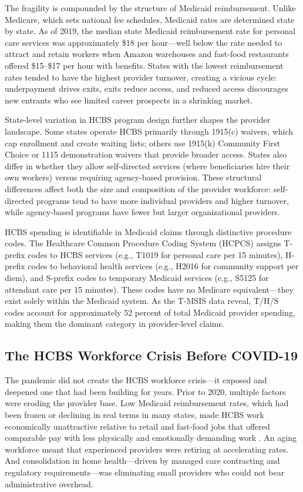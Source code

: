 \documentclass[12pt]{article}
\begin{document}
The fragility is compounded by the structure of Medicaid reimbursement. Unlike Medicare, which sets national fee schedules, Medicaid rates are determined state by state. As of 2019, the median state Medicaid reimbursement rate for personal care services was approximately \$18 per hour---well below the rate needed to attract and retain workers when Amazon warehouses and fast-food restaurants offered \$15--\$17 per hour with benefits. States with the lowest reimbursement rates tended to have the highest provider turnover, creating a vicious cycle: underpayment drives exits, exits reduce access, and reduced access discourages new entrants who see limited career prospects in a shrinking market.

State-level variation in HCBS program design further shapes the provider landscape. Some states operate HCBS primarily through 1915(c) waivers, which cap enrollment and create waiting lists; others use 1915(k) Community First Choice or 1115 demonstration waivers that provide broader access. States also differ in whether they allow self-directed services (where beneficiaries hire their own workers) versus requiring agency-based provision. These structural differences affect both the size and composition of the provider workforce: self-directed programs tend to have more individual providers and higher turnover, while agency-based programs have fewer but larger organizational providers.

HCBS spending is identifiable in Medicaid claims through distinctive procedure codes. The Healthcare Common Procedure Coding System (HCPCS) assigns T-prefix codes to HCBS services (e.g., T1019 for personal care per 15 minutes), H-prefix codes to behavioral health services (e.g., H2016 for community support per diem), and S-prefix codes to temporary Medicaid services (e.g., S5125 for attendant care per 15 minutes). These codes have no Medicare equivalent---they exist solely within the Medicaid system. As the T-MSIS data reveal, T/H/S codes account for approximately 52 percent of total Medicaid provider spending, making them the dominant category in provider-level claims.

\subsection{The HCBS Workforce Crisis Before COVID-19}

The pandemic did not create the HCBS workforce crisis---it exposed and deepened one that had been building for years. Prior to 2020, multiple factors were eroding the provider base. Low Medicaid reimbursement rates, which had been frozen or declining in real terms in many states, made HCBS work economically unattractive relative to retail and fast-food jobs that offered comparable pay with less physically and emotionally demanding work \citep{scales2020hcbs}. An aging workforce meant that experienced providers were retiring at accelerating rates. And consolidation in home health---driven by managed care contracting and regulatory requirements---was eliminating small providers who could not bear administrative overhead.
\end{document}
